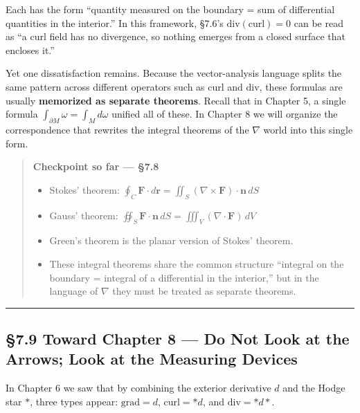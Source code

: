 Each has the form ``quantity measured on the boundary = sum of
differential quantities in the interior.'' In this framework, §7.6's
\(\mathrm{div}(\mathrm{curl})=0\) can be read as ``a curl field has no
divergence, so nothing emerges from a closed surface that encloses it.''

Yet one dissatisfaction remains. Because the vector-analysis language
splits the same pattern across different operators such as curl and div,
these formulas are usually \textbf{memorized as separate theorems}.
Recall that in Chapter 5, a single formula
\(\int_{\partial M}\omega = \int_M d\omega\) unified all of these. In
Chapter 8 we will organize the correspondence that rewrites the integral
theorems of the \(\nabla\) world into this single form.

\begin{quote}
\textbf{Checkpoint so far — §7.8}

\begin{itemize}
\item
  Stokes' theorem:
  \(\oint_C \mathbf{F}\cdot d\mathbf{r} = \iint_S (\nabla\times\mathbf{F})\cdot\mathbf{n}\,dS\)
\item
  Gauss' theorem:
  \(\oiint_S \mathbf{F}\cdot\mathbf{n}\,dS = \iiint_V (\nabla\cdot\mathbf{F})\,dV\)
\item
  Green's theorem is the planar version of Stokes' theorem.
\item
  These integral theorems share the common structure ``integral on the
  boundary = integral of a differential in the interior,'' but in the
  language of \(\nabla\) they must be treated as separate theorems.
\end{itemize}
\end{quote}

\begin{center}\rule{0.5\linewidth}{0.5pt}\end{center}

\hypertarget{toward-chapter-8-do-not-look-at-the-arrows-look-at-the-measuring-devices}{%
\subsection{§7.9 Toward Chapter 8 --- Do Not Look at the Arrows; Look at
the Measuring
Devices}\label{toward-chapter-8-do-not-look-at-the-arrows-look-at-the-measuring-devices}}

In Chapter 6 we saw that by combining the exterior derivative \(d\) and
the Hodge star \(\ast\), three types appear: \(\mathrm{grad}=d\),
\(\mathrm{curl}=\ast d\), and \(\mathrm{div}=\ast d\ast\).

